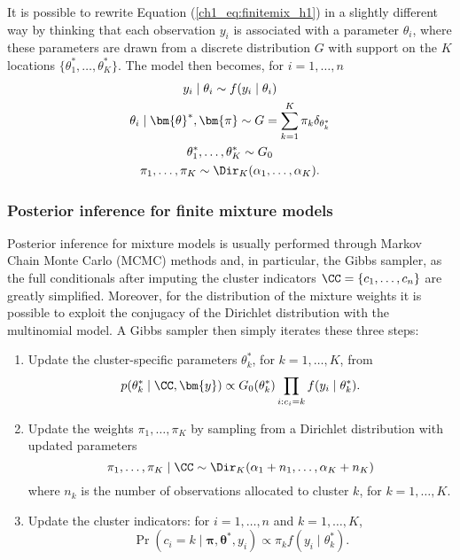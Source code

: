It is possible to rewrite Equation (\ref{ch1_eq:finitemix_h1}) in a slightly different way by thinking that each observation $y_i$ is associated with a parameter $\theta_i$, where these parameters are drawn from a discrete distribution $G$ with support on the $K$ locations $\{\theta^*_1,\dots,\theta^*_K\}$. The model then becomes, for $i=1,\dots,n$
\begin{equation}
\begin{gathered}
y_i \mid \theta_i \sim f(y_i\mid\theta_i)\\
\theta_i \mid \bm{\theta}^*,\bm{\pi} \sim G = \sum_{k=1}^K \pi_k \delta_{\theta^*_k}\\
\theta^*_1,\dots,\theta^*_K \sim G_0\\
\pi_1,\dots,\pi_K \sim \Dir_K(\alpha_1,\dots,\alpha_K).
\end{gathered}
\label{ch1_eq:finitemix_h2}
\end{equation}

\subsubsection*{Posterior inference for finite mixture models}
Posterior inference for mixture models is usually performed through Markov Chain Monte Carlo (MCMC) methods and, in particular, the Gibbs sampler, as the full conditionals after imputing the cluster indicators $\CC = \{c_1,\dots,c_n\}$ are greatly simplified.
Moreover, for the distribution of the mixture weights it is possible to exploit the conjugacy of the Dirichlet distribution with the multinomial model. A Gibbs sampler then simply iterates these three steps:
\begin{enumerate}
	\item Update the cluster-specific parameters $\theta^*_k$, for $k=1,\dots,K$, from
	$$ p(\theta^*_k \mid \CC, \bm{y}) \propto G_0(\theta^*_k) \prod_{i:c_i=k} f(y_i\mid\theta^*_{k}). $$
	\item Update the weights $\pi_1,\dots,\pi_K$ by sampling from a Dirichlet distribution with updated parameters
	$$ \pi_1,\dots,\pi_K\mid \CC \sim  \Dir_K(\alpha_1 + n_1,\dots,\alpha_K + n_K) $$
	where $n_k$ is the number of observations allocated to cluster $k$, for $k=1,\dots,K$.
	\item Update the cluster indicators: for $i=1,\dots,n$ and $k=1,\dots,K$,
	$$ \Pr(c_i = k\mid \bm{\pi},\bm{\theta}^*, y_i) \propto \pi_k f(y_i\mid\theta^*_{k})  .$$
\end{enumerate}



